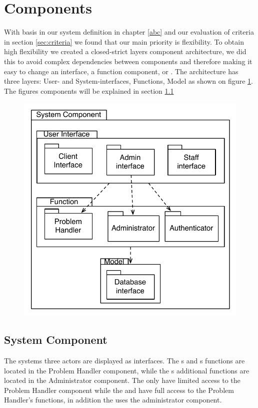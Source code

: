 \section{Components}
With basis in our system definition in chapter \ref{abc} and our evaluation of criteria in section \ref{sec:criteria} we found that our main priority is flexibility. To obtain high flexibility we created a closed-strict layers component architecture, we did this to avoid complex dependencies between components and therefore making it easy to change an interface, a function component, or . 
The architecture has three layers: User- and System-interfaces, Functions, Model as shown on figure \ref{fig:SystemComponent}. The figures components will be explained in section \ref{sub:SystemComponent} 

\begin{figure}[]
	\centering
		\includegraphics[scale=0.5]{input/architectural_design/system_component_denvibruger.pdf}
	\label{fig:SystemComponent}
\end{figure}


\subsection{System Component}
\label{sub:SystemComponent}
The systems three actors are displayed as interfaces. The \aclient s and \astaff s functions are located in the Problem Handler component, while the \admin s additional functions are located in the Administrator component. The \aclient[] only have limited access to the Problem Handler component while the \astaff[] and \admin[] have full access to the Problem Handler's functions, in addition the \admin[] uses the administrator component. 





